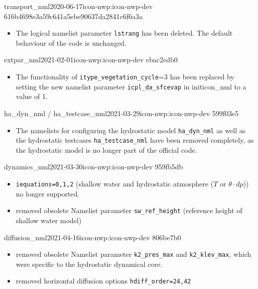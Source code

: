 \begin{changeitem}{transport\_nml}{2020-06-17}{icon-nwp:icon-nwp-dev 616b4698e3a59c641a5ebe90637da2841c6f6a3a}
  \begin{itemize}
   \item The logical namelist parameter \texttt{lstrang} has been deleted. The default behaviour of the code is unchanged.
  \end{itemize}
\end{changeitem}

\begin{changeitem}{extpar\_nml}{2021-02-01}{icon-nwp:icon-nwp-dev ebac2edb0}
  \begin{itemize}
   \item The functionality of \texttt{itype\_vegetation\_cycle}=3 has been replaced by setting the new namelist parameter \texttt{icpl\_da\_sfcevap} 
    in initicon\_nml to a value of 1.
  \end{itemize}
\end{changeitem}

\begin{changeitem}{ha\_dyn\_nml / ha\_testcase\_nml}{2021-03-29}{icon-nwp:icon-nwp-dev 599f03e5}
  \begin{itemize}
   \item The namelists for configuring the hydrostatic model \texttt{ha\_dyn\_nml} as well as the hydrostatic testcases 
   \texttt{ha\_testcase\_nml} have been removed completely, as the hydrostatic model is no longer part of the official code.
  \end{itemize}
\end{changeitem}

\begin{changeitem}{dynamics\_nml}{2021-03-30}{icon-nwp:icon-nwp-dev 959fb5db}
  \begin{itemize}
   \item \texttt{iequations=0,1,2} (shallow water and hydrostatic atmosphere ($T$ or $\theta\cdot dp$)) no longer supported.
   \item removed obsolete Namelist parameter \texttt{sw\_ref\_height} (reference height of shallow water model)
  \end{itemize}
\end{changeitem}

\begin{changeitem}{diffusion\_nml}{2021-04-16}{icon-nwp:icon-nwp-dev 806be7b0}
  \begin{itemize}
   \item removed obsolete Namelist parameter \texttt{k2\_pres\_max} and \texttt{k2\_klev\_max}, which were specific to the hydrostatic dynamical core.
   \item removed horizontal diffusion options \texttt{hdiff\_order=24,42}
  \end{itemize}
\end{changeitem}

